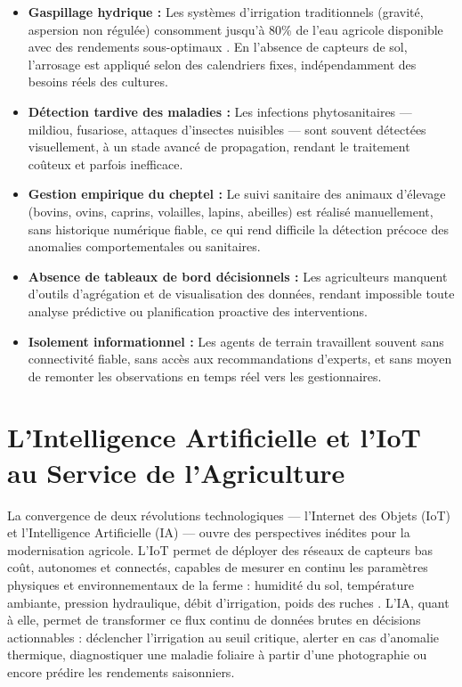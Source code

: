 \documentclass[12pt, a4paper]{report}
\begin{document}
\begin{itemize}[leftmargin=*, label=\textcolor{primary}{$\bullet$}]
    \item \textbf{Gaspillage hydrique :} Les systèmes d'irrigation traditionnels (gravité, aspersion non régulée) consomment jusqu'à 80\% de l'eau agricole disponible avec des rendements sous-optimaux \cite{worldbank2019}. En l'absence de capteurs de sol, l'arrosage est appliqué selon des calendriers fixes, indépendamment des besoins réels des cultures.

    \item \textbf{Détection tardive des maladies :} Les infections phytosanitaires — mildiou, fusariose, attaques d'insectes nuisibles — sont souvent détectées visuellement, à un stade avancé de propagation, rendant le traitement coûteux et parfois inefficace.

    \item \textbf{Gestion empirique du cheptel :} Le suivi sanitaire des animaux d'élevage (bovins, ovins, caprins, volailles, lapins, abeilles) est réalisé manuellement, sans historique numérique fiable, ce qui rend difficile la détection précoce des anomalies comportementales ou sanitaires.

    \item \textbf{Absence de tableaux de bord décisionnels :} Les agriculteurs manquent d'outils d'agrégation et de visualisation des données, rendant impossible toute analyse prédictive ou planification proactive des interventions.

    \item \textbf{Isolement informationnel :} Les agents de terrain travaillent souvent sans connectivité fiable, sans accès aux recommandations d'experts, et sans moyen de remonter les observations en temps réel vers les gestionnaires.
\end{itemize}

\section*{L'Intelligence Artificielle et l'IoT au Service de l'Agriculture}

La convergence de deux révolutions technologiques — l'Internet des Objets (IoT) et l'Intelligence Artificielle (IA) — ouvre des perspectives inédites pour la modernisation agricole. L'IoT permet de déployer des réseaux de capteurs bas coût, autonomes et connectés, capables de mesurer en continu les paramètres physiques et environnementaux de la ferme : humidité du sol, température ambiante, pression hydraulique, débit d'irrigation, poids des ruches \cite{pivoto2021}. L'IA, quant à elle, permet de transformer ce flux continu de données brutes en décisions actionnables : déclencher l'irrigation au seuil critique, alerter en cas d'anomalie thermique, diagnostiquer une maladie foliaire à partir d'une photographie ou encore prédire les rendements saisonniers.
\end{document}
